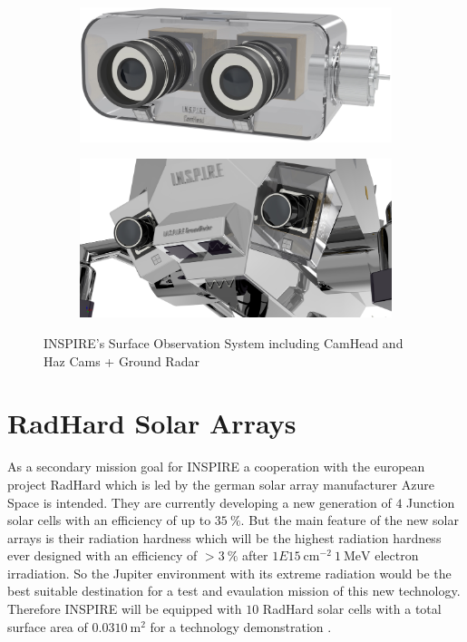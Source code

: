 \begin{figure}[htb]
     \centering
     \begin{subfigure}[b]{0.45\textwidth}
         \centering
         \includegraphics[width=\textwidth]{Media/CamHead}
         \label{fig:CamHead}
     \end{subfigure}
     \hfill
     \begin{subfigure}[b]{0.45\textwidth}
         \centering
         \includegraphics[width=\textwidth]{Media/HazCam_GroundRadar}
         \label{fig:HazCam}
     \end{subfigure}
     \hfill
     \caption{INSPIRE's Surface Observation System including CamHead and Haz Cams + Ground Radar}
     \label{fig:Observation}
\end{figure}

\section{RadHard Solar Arrays}
\label{subsec:radhard}
As a secondary mission goal for INSPIRE a cooperation with the european project RadHard which is led by the german solar array manufacturer Azure Space is intended. They are currently developing a new generation of $4$ Junction solar cells with an efficiency of up to $35~\% $. But the main feature of the new solar arrays is their radiation hardness which will be the highest radiation hardness ever designed with an efficiency of $>3~\% $ after $1E15~\text{cm}^{-2} \ 1~\text{MeV}$ electron irradiation. So the Jupiter environment with its extreme radiation would be the best suitable destination for a test and evaulation mission of this new technology. Therefore INSPIRE will be equipped with $10$ RadHard solar cells with a total surface area of $0.0310~\text{m}^2$ for a technology demonstration \cite{FraunhoferInstituteforSolarEnergySystemsISE.2021}.

